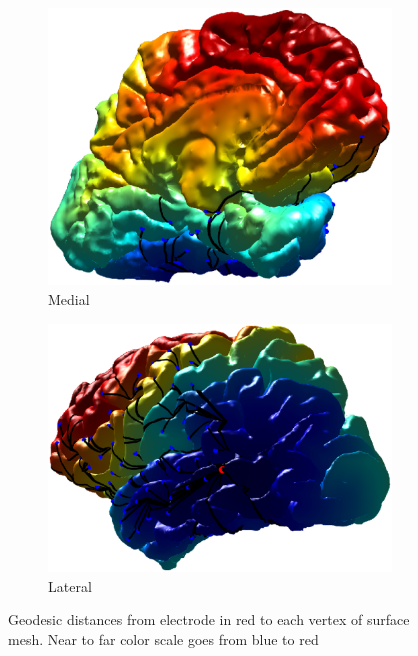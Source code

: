 \begin{figure}
    \begin{subfigure}{.45\textwidth}
    \centering
    \includegraphics[width=.85\linewidth]{Figures/IR38_54toall_antmed.eps}
        \caption{Medial}
        \label{fig:sfig1}
    \end{subfigure}
    \begin{subfigure}{.45\textwidth}
    \centering
    \includegraphics[width=.9\linewidth]{Figures/IR38_54toall_latpost.eps}
        \caption{Lateral}
        \label{fig:sfig2}
    \end{subfigure}
    \caption{Geodesic distances from electrode in red to each vertex of surface mesh. Near to far color scale goes from blue to red}
    \label{fig:GeoDist}
\end{figure}

